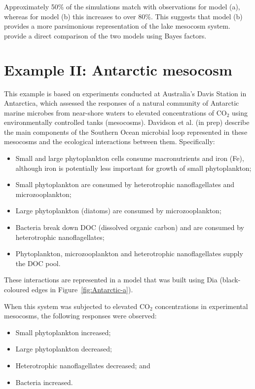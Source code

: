 \documentclass[a4paper]{article}\usepackage[]{graphicx}\usepackage[]{color}
\begin{document}
Approximately 50\% of the simulations match with observations for model (a),
whereas for model (b) this increases to over 80\%. This suggests that model (b)
provides a more parsimonious representation of the lake mesocosm system.
\cite{JMT2012} provide a direct comparison of the two models using Bayes factors.

\section{Example II: Antarctic mesocosm}
This example is based on experiments conducted at Australia's Davis Station in
Antarctica, which assessed the responses of a natural community of Antarctic
marine microbes from near-shore waters to elevated concentrations of $\mathrm{CO}_{2}$
using environmentally controlled tanks (mesocosms). Davidson et al.
(in prep) describe the main components of the Southern Ocean microbial loop
represented in these mesocosms and the ecological interactions between them.
Specifically:
\begin{itemize}
\item Small and large phytoplankton cells consume macronutrients and iron (Fe),
although iron is potentially less important for growth of small phytoplankton;
\item Small phytoplankton are consumed by heterotrophic nanoflagellates and
microzooplankton;
\item Large phytoplankton (diatoms) are consumed by microzooplankton;
\item Bacteria break down DOC (dissolved organic carbon) and are consumed by
heterotrophic nanoflagellates;
\item Phytoplankton, microzooplankton and heterotrophic nanoflagellates supply
the DOC pool.
\end{itemize}
These interactions are represented in a model that was built using Dia
(black-coloured edges in Figure~\ref{fig:Antarctic-a}).

When this system was subjected to elevated $\mathrm{CO}_{2}$ concentrations in experimental
mesocosms, the following responses were observed:
\begin{itemize}
\item Small phytoplankton increased;
\item Large phytoplankton decreased;
\item Heterotrophic nanoflagellates decreased; and
\item Bacteria increased.
\end{itemize}
\end{document}

